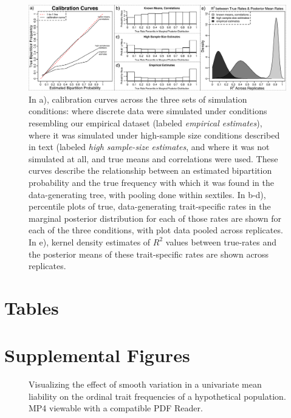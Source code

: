 \begin{figure}[h]
\centering
\includegraphics[width=160mm]{figures/chpt4_figure8.pdf}
\caption[Calibration Curves for TSAR-MBOP Simulation Study]{In a), calibration curves across the three sets of simulation conditions: where discrete data were simulated under conditions resembling our empirical dataset (labeled \textit{empirical estimates}), where it was simulated under high-sample size conditions described in text (labeled \textit{high sample-size estimates}, and where it was not simulated at all, and true means and correlations were used. These curves describe the relationship between an estimated bipartition probability and the true frequency with which it was found in the data-generating tree, with pooling done within sextiles. In b-d), percentile plots of true, data-generating trait-specific rates in the marginal posterior distribution for each of those rates are shown for each of the three conditions, with plot data pooled across replicates. In e), kernel density estimates of $R^2$ values between true-rates and the posterior means of these trait-specific rates are shown across replicates. \label{overflow}
\label{fig:simsCalibration}
}
\end{figure}

\clearpage

\section{Tables}



\clearpage

\section{Supplemental Figures}

\label{supp:SupplementalFiguresThresholdModel}

\opensupplement

\begin{figure}[h]
\centering
{}
\caption[Varying the Location of a Population Mean Under the Univariate Threshold Model]{Visualizing the effect of smooth variation in a univariate mean liability on the ordinal trait frequencies of a hypothetical population. MP4 viewable with a compatible PDF Reader.}
\label{fig:univMuSmooth}
\end{figure}

